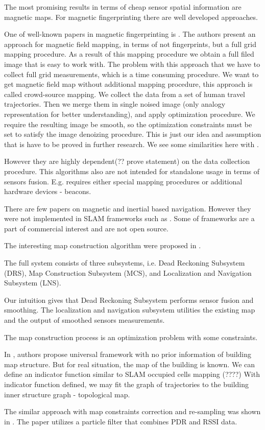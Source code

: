 The most promising results in terms of cheap sensor spatial information are magnetic maps. For magnetic fingerprinting there are well developed approaches.

One of well-known papers in magnetic fingerprinting is \cite{Grand20123AxisMF}. The authors present an approach for magnetic field mapping, in terms of not fingerprints, but a full grid mapping procedure. As a result of this mapping procedure we obtain a full filed image that is easy to work with.
The problem with this approach that we have to collect full grid measurements, which is a time consuming procedure. We want to get magnetic field map without additional mapping procedure, this approach is called crowd-source mapping. We collect the data from a set of human travel trajectories. Then we merge them in single noised image (only analogy representation for better understanding), and apply optimization procedure. We require the resulting image be smooth, so the optimization constraints must be set to satisfy the image denoizing procedure. This is just our idea and assumption that is have to be proved in further research.
We see some similarities here with \cite{Cimloc}.

However they are highly dependent(?? prove statement) on the data collection procedure. This algorithms also are not intended for standalone usage in terms of sensors fusion. E.g. requires either special mapping procedures or additional hardware devices - beacons.

There are few papers on magnetic and inertial based navigation. However they were not implemented in SLAM frameworks such as \cite{GraphSLAMCrowdsourceWiFI}. Some of frameworks are a part of commercial interest and are not open source.

The interesting map construction algorithm were proposed in \cite{Cimloc}. 

The full system consists of three subsystems, i.e. Dead Reckoning Subsystem (DRS), Map Construction Subsystem (MCS), and Localization and Navigation Subsystem (LNS). 

Our intuition gives that Dead Reckoning Subsystem performs sensor fusion and smoothing. The localization and navigation subsystem utilities the existing map and the output of smoothed sensors measurements.

The map construction process is an optimization problem with some constraints.

In \cite{Cimloc}, authors propose universal framework with no prior information of building map structure.
But for real situation, the map of the building is known.
We can define an indicator function similar to SLAM occupied cells mapping (????)
With indicator function defined, we may fit the graph of trajectories to the building inner structure graph - topological map.

The similar approach with map constraints correction and re-sampling was shown in \cite{articleXia}. The paper utilizes a   particle   filter that combines PDR and RSSI data.






